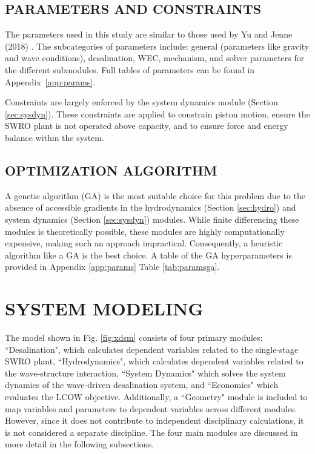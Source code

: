 \documentclass[twocolumn,10pt]{asme2e}
\begin{document}
\subsection{PARAMETERS AND CONSTRAINTS}
The parameters used in this study are similar to those used by Yu and Jenne (2018) \cite{Yu2018}. The subcategories of parameters include: general (parameters like gravity and wave conditions), desalination, WEC, mechanism, and solver parameters for the different submodules. Full tables of parameters can be found in Appendix~\ref{app:params}.

Constraints are largely enforced by the system dynamics module (Section \ref{sec:sysdyn}). These constraints are applied to constrain piston motion, ensure the SWRO plant is not operated above capacity, and to ensure force and energy balance within the system.

\vspace{-1em}

\subsection{OPTIMIZATION ALGORITHM}
A genetic algorithm (GA) is the most suitable choice for this problem due to the absence of accessible gradients in the hydrodynamics (Section \ref{sec:hydro}) and system dynamics (Section \ref{sec:sysdyn}) modules. While finite differencing these modules is theoretically possible, these modules are highly computationally expensive, making such an approach impractical. Consequently, a heuristic algorithm like a GA is the best choice. A table of the GA hyperparameters is provided in Appendix \ref{app:params} Table \ref{tab:paramsga}.

\vspace{-1em}

\section{SYSTEM MODELING} \label{sec:sysmodel}
The model shown in Fig. \ref{fig:xdsm} consists of four primary modules: ``Desalination", which calculates dependent variables related to the single-stage SWRO plant, ``Hydrodynamics", which calculates dependent variables related to the wave-structure interaction, ``System Dynamics" which solves the system dynamics of the wave-driven desalination system, and ``Economics" which evaluates the LCOW objective. Additionally, a ``Geometry" module is included to map variables and parameters to dependent variables across different modules. However, since it does not contribute to independent disciplinary calculations, it is not considered a separate discipline. The four main modules are discussed in more detail in the following subsections. 
\end{document}
